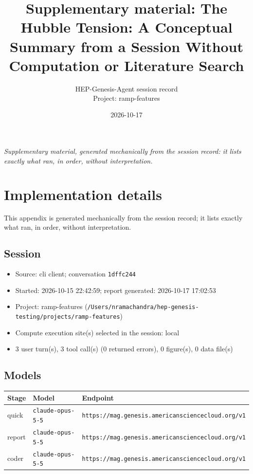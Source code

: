 \documentclass[11pt,a4paper]{article}
\title{Supplementary material: The Hubble Tension: A Conceptual Summary from a Session Without Computation or Literature Search}
\author{HEP-Genesis-Agent session record \\ \small Project: ramp-features}
\date{2026-10-17}
\begin{document}
\maketitle
\noindent\textit{\small Supplementary material, generated mechanically from the session record: it lists exactly what ran, in order, without interpretation.}
\vspace{1em}



\appendix
\section{Implementation details}
\label{app:impl}
This appendix is generated mechanically from the session record; it lists exactly what ran, in order, without interpretation.
\subsection{Session}
\begin{itemize}
  \item Source: cli client; conversation \texttt{1dffc244}
  \item Started: 2026-10-15 22:42:59; report generated: 2026-10-17 17:02:53
  \item Project: ramp-features (\texttt{/\allowbreak{}Users/\allowbreak{}nramachandra/\allowbreak{}hep-genesis-testing/\allowbreak{}projects/\allowbreak{}ramp-features})
  \item Compute execution site(s) selected in the session: local
  \item 3 user turn(s), 3 tool call(s) (0 returned errors), 0 figure(s), 0 data file(s)
\end{itemize}
\subsection{Models}
\begin{longtable}{@{}p{}p{}p{}@{}}
\toprule Stage & Model & Endpoint \\ \midrule \endhead
quick & \texttt{claude-opus-5-5} & \texttt{https:\allowbreak{}/\allowbreak{}/\allowbreak{}mag.genesis.americansciencecloud.org/\allowbreak{}v1} \\
report & \texttt{claude-opus-5-5} & \texttt{https:\allowbreak{}/\allowbreak{}/\allowbreak{}mag.genesis.americansciencecloud.org/\allowbreak{}v1} \\
coder & \texttt{claude-opus-5-5} & \texttt{https:\allowbreak{}/\allowbreak{}/\allowbreak{}mag.genesis.americansciencecloud.org/\allowbreak{}v1} \\
\bottomrule\end{longtable}
\end{document}
